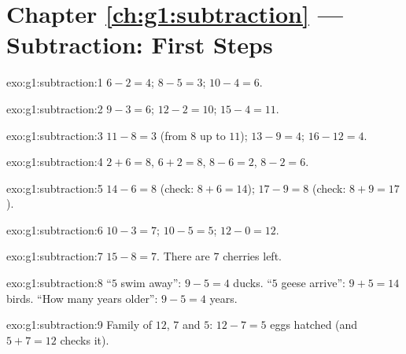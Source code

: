 \section*{Chapter \ref{ch:g1:subtraction} --- Subtraction: First Steps}

\begin{solution}{exo:g1:subtraction:1}
$6 - 2 = 4$; \quad $8 - 5 = 3$; \quad $10 - 4 = 6$.
\end{solution}

\begin{solution}{exo:g1:subtraction:2}
$9 - 3 = 6$; \quad $12 - 2 = 10$; \quad $15 - 4 = 11$.
\end{solution}

\begin{solution}{exo:g1:subtraction:3}
$11 - 8 = 3$ (from $8$ up to $11$); \quad
$13 - 9 = 4$; \quad $16 - 12 = 4$.
\end{solution}

\begin{solution}{exo:g1:subtraction:4}
$2 + 6 = 8$, \quad $6 + 2 = 8$, \quad $8 - 6 = 2$, \quad
$8 - 2 = 6$.
\end{solution}

\begin{solution}{exo:g1:subtraction:5}
$14 - 6 = 8$ (check: $8 + 6 = 14$); \quad
$17 - 9 = 8$ (check: $8 + 9 = 17$).
\end{solution}

\begin{solution}{exo:g1:subtraction:6}
$10 - 3 = 7$; \quad $10 - 5 = 5$; \quad $12 - 0 = 12$.
\end{solution}

\begin{solution}{exo:g1:subtraction:7}
$15 - 8 = 7$. There are $7$ cherries left.
\end{solution}

\begin{solution}{exo:g1:subtraction:8}
``$5$ swim away'': $9 - 5 = 4$ ducks. ``$5$ geese arrive'':
$9 + 5 = 14$ birds. ``How many years older'': $9 - 5 = 4$ years.
\end{solution}

\begin{solution}{exo:g1:subtraction:9}
Family of $12$, $7$ and $5$: $12 - 7 = 5$ eggs hatched (and
$5 + 7 = 12$ checks it).
\end{solution}

